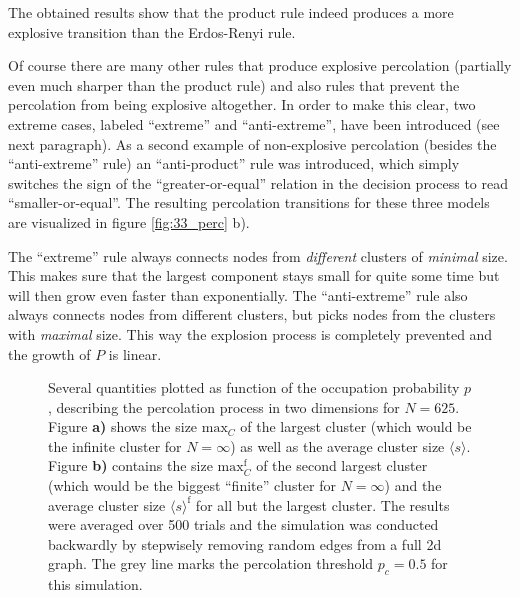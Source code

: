 \documentclass{scrartcl}
\begin{document}
The obtained results show that the product rule indeed produces a more
explosive transition than the Erdos-Renyi rule.

 Of course there are many other rules that produce
explosive percolation (partially even much sharper than the product rule)
and also rules that prevent the percolation from being explosive
altogether. In order to make this clear, two extreme cases, labeled
\enquote{extreme} and \enquote{anti-extreme}, have been introduced (see
next paragraph).  As a second example of non-explosive percolation (besides
the \enquote{anti-extreme} rule) an \enquote{anti-product} rule was
introduced, which simply switches the sign of the
\enquote{greater-or-equal} relation in the decision process to read
\enquote{smaller-or-equal}. The resulting percolation transitions for these
three models are visualized in figure \ref{fig:33_perc} b).

The \enquote{extreme} rule always connects nodes from \emph{different}
clusters of \emph{minimal} size. This makes sure that the largest component
stays small for quite some time but will then grow even faster than
exponentially. 
The \enquote{anti-extreme} rule also always connects nodes from different clusters,
but picks nodes from the clusters with \emph{maximal} size. This way the explosion process
is completely prevented and the growth of $P$ is linear.

\begin{figure}
    \caption{Several quantities plotted as function of the occupation probability
        $p$, describing the percolation process in two dimensions for
        $N=625$. Figure \textbf{a)} shows the size $\mathrm{max}_C$ of the
        largest cluster (which would be the infinite cluster for $N
        = \infty$) as well as the average cluster size $\langle s\rangle$.
        Figure \textbf{b)} contains the size $\mathrm{max}_C^\mathrm{f}$ of
        the second largest cluster (which would be the biggest
        \enquote{finite} cluster for $N=\infty$) and the average cluster
        size $\langle s\rangle^\mathrm{f}$ for all but the largest cluster.
        The results were averaged over 500 trials and the simulation was
        conducted backwardly by stepwisely removing random edges from a full
        2d graph. The grey line marks the percolation threshold $p_c=0.5$ for
        this simulation.}
    \label{fig:31_2d}
\end{figure}
\end{document}

